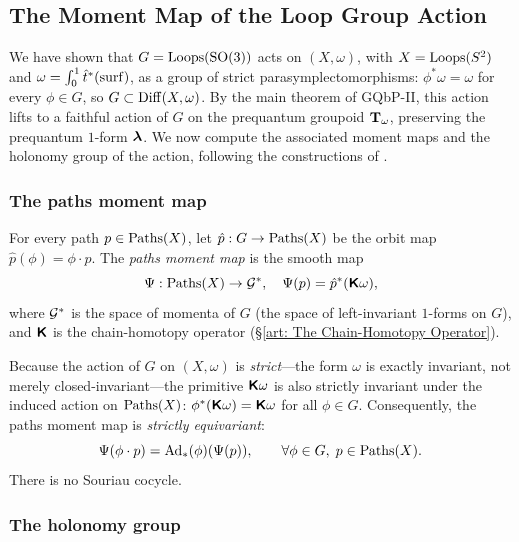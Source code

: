 \documentclass[11pt,reqno,letterpaper,twoside]{amsart}
\renewcommand{\TT}{\Groupoid{T}}
\begin{document}

\subsection{The Moment Map of the Loop Group Action}

We have shown that $G = \operatorname{Loops}(\mathrm{SO}(3))$ acts on $(X,\omega)$,
with $X = \operatorname{Loops}(S^{2})$ and $\omega = \int_{0}^{1}\hat{t}^{*}(\operatorname{surf})$,
as a group of strict parasymplectomorphisms:
$\phi^{*}\omega = \omega$ for every $\phi \in G$, so $G \subset \operatorname{Diff}(X,\omega)$.
By the main theorem of GQbP-II, this action lifts to a faithful action
of $G$ on the prequantum groupoid $\TT_{\omega}$,
preserving the prequantum $1$-form $\boldsymbol \lambda$.
We now compute the associated moment maps and the holonomy group
of the action, following the constructions of \cite{PIZ10}.

\subsubsection{The paths moment map}

For every path $p \in \operatorname{Paths}(X)$, let $\hat{p} : G \to \operatorname{Paths}(X)$ be the orbit map
$\hat{p}(\phi) = \phi \cdot p$.
The \emph{paths moment map} is the smooth map
\[
\Psi : \operatorname{Paths}(X) \to \mathcal{G}^{*},
\quad
\Psi(p) = \hat{p}^{*}(\boldsymbol{\mathsf{K}}\omega),
\]
where $\mathcal{G}^{*}$ is the space of momenta of $G$ (the space of left-invariant
$1$-forms on $G$), and $\boldsymbol{\mathsf{K}}$ is the chain-homotopy operator
(\S\ref{art: The Chain-Homotopy Operator}).

Because the action of $G$ on $(X,\omega)$ is \emph{strict}---the form $\omega$
is exactly invariant, not merely closed-invariant---the primitive $\boldsymbol{\mathsf{K}}\omega$
is also strictly invariant under the induced action on $\operatorname{Paths}(X)$:
$\phi^{*}(\boldsymbol{\mathsf{K}}\omega) = \boldsymbol{\mathsf{K}}\omega$ for all $\phi \in G$.
Consequently, the paths moment map is \emph{strictly equivariant}:
\[
\Psi(\phi \cdot p) = \mathrm{Ad}_{*}(\phi)(\Psi(p)), \qquad \forall \phi \in G,\; p \in \operatorname{Paths}(X).
\]
There is no Souriau cocycle.

\subsubsection{The holonomy group}
\end{document}
